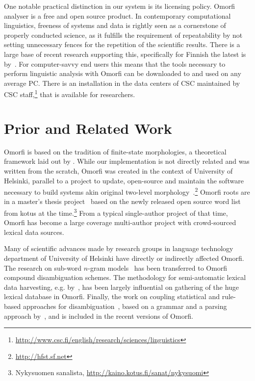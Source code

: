 \documentclass[preprint]{flammie}
\begin{document}
One notable practical distinction in our system is its licensing policy. Omorfi
analyser is a free and open source product.  In contemporary computational
linguistics, freeness of systems and data is rightly seen as a cornerstone of
properly conducted science, as it fulfills the requirement of repeatability by
not setting unnecessary fences for the repetition of the scientific results.
There is a large base of recent research supporting this, specifically for
Finnish the latest is by~\citet{koskenniemi2008build}. For computer-savvy end
users this means that the tools necessary to perform linguistic analysis with
Omorfi can be downloaded to and used on any average PC. There is an
installation in the data centers of CSC maintained by CSC
staff,\footnote{\url{http://www.csc.fi/english/research/sciences/linguistics}}
that is available for researchers.

\section{Prior and Related Work}
\label{sec:prior-work}

Omorfi is based on the tradition of finite-state morphologies, a theoretical
framework laid out by \citet{koskenniemi1983twolevel}. While our implementation
is not directly related and was written from the scratch, Omorfi was created in
the context of University of Helsinki, parallel to a project to update,
open-source and maintain the software necessary to build systems akin original
two-level morphology~\citep{hfst2012}.\footnote{\url{http://hfst.sf.net}}
Omorfi roots are in a master's thesis project~\citep{pirinen2008suomen} based
on the newly released open source word list from kotus at the
time.\footnote{Nykysuomen sanalista,
\url{http://kaino.kotus.fi/sanat/nykysuomi}} From a typical single-author
project of that time, Omorfi has  become a large coverage multi-author
project with crowd-sourced lexical data sources.

Many of scientific advances made by research groups in language technology
department of University of Helsinki have directly or indirectly affected
Omorfi. The research on sub-word \(n\)-gram
models~\citep{pirinen2009weighted,pirinen2009weighting} has been transferred
to Omorfi compound disambiguation schemes. The methodology for
semi-automatic lexical data harvesting, e.g.
by~\citet{linden2008probabilistic}, has been largely influential on
gathering of the huge lexical database in Omorfi. Finally, the work on
coupling statistical and rule-based approaches for
disambiguation~\citep{pirinen2015using}, based on a grammar and a parsing
approach by~\citet{karlsson1995constraint}, and is included in the recent
versions of Omorfi.
\end{document}
